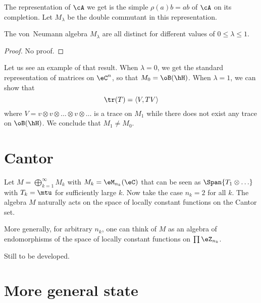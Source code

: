 The representation of $\cA$ we get is the simple $\rho(a)b=ab$ of $\cA$ on its completion. Let $M_{\lambda}$ be the double commutant in this representation.

\begin{theorem}[Powers]
	The von~Neumann algebra $M_{\lambda}$ are all distinct for different values of $0\leq\lambda\leq 1$.
\end{theorem}
\begin{proof}
	No proof.
\end{proof}

Let us see an example of that result. When $\lambda=0$, we get the standard representation of matrices on $\eC^n$, so that $M_0=\oB(\hH)$. When $\lambda=1$, we can show that
\[
	\tr(T)=\langle V, TV\rangle
\]
where $V=v\otimes v\otimes\ldots\otimes v\otimes\ldots$ is a trace on $M_1$ while there does not exist any trace on $\oB(\hH)$. We conclude that $M_1\neq M_0$.

\section{Cantor}

Let $M=\bigoplus_{k=1}^{\infty}M_k$ with $M_k=\eM_{n_k}(\eC)$ that can be seen as $\Span\{ T_1\otimes\ldots \}$ with $T_k=\mtu$ for sufficiently large $k$. Now take the case $n_k=2$ for all $k$. The algebra $M$ naturally acts on the space of locally constant functions on the Cantor set.

More generally, for arbitrary $n_k$, one can think of $M$ as an algebra of endomorphisms of the space of locally constant functions on $\prod\eZ_{n_k}$.
\begin{probleme}
	Still to be developed.
\end{probleme}

\section{More general state}

